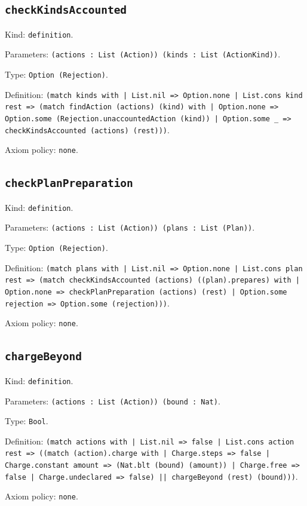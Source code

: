 \documentclass[11pt]{article}
\begin{document}
\subsection*{\texttt{checkKindsAccounted}}
\noindent Kind: \texttt{definition}.\par
\noindent Parameters: \texttt{(actions : List (Action)) (kinds : List (ActionKind))}.\par
\noindent Type: \texttt{Option (Rejection)}.\par
\noindent Definition: \texttt{(match kinds with | List.nil => Option.none | List.cons kind rest => (match findAction (actions) (kind) with | Option.none => Option.some (Rejection.unaccountedAction (kind)) | Option.some \_ => checkKindsAccounted (actions) (rest)))}.\par
\noindent Axiom policy: \texttt{none}.\par
\subsection*{\texttt{checkPlanPreparation}}
\noindent Kind: \texttt{definition}.\par
\noindent Parameters: \texttt{(actions : List (Action)) (plans : List (Plan))}.\par
\noindent Type: \texttt{Option (Rejection)}.\par
\noindent Definition: \texttt{(match plans with | List.nil => Option.none | List.cons plan rest => (match checkKindsAccounted (actions) ((plan).prepares) with | Option.none => checkPlanPreparation (actions) (rest) | Option.some rejection => Option.some (rejection)))}.\par
\noindent Axiom policy: \texttt{none}.\par
\subsection*{\texttt{chargeBeyond}}
\noindent Kind: \texttt{definition}.\par
\noindent Parameters: \texttt{(actions : List (Action)) (bound : Nat)}.\par
\noindent Type: \texttt{Bool}.\par
\noindent Definition: \texttt{(match actions with | List.nil => false | List.cons action rest => ((match (action).charge with | Charge.steps => false | Charge.constant amount => (Nat.blt (bound) (amount)) | Charge.free => false | Charge.undeclared => false) || chargeBeyond (rest) (bound)))}.\par
\noindent Axiom policy: \texttt{none}.\par
\end{document}

